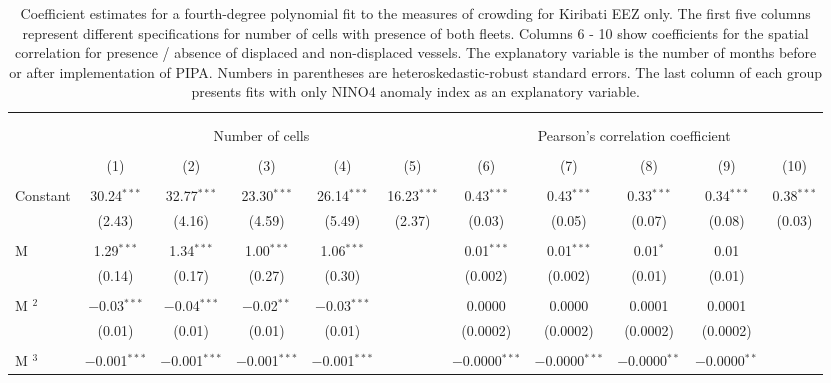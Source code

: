 
\begin{table}[H] \centering 
  \caption{\label{tab:KIR_sp_corr}Coefficient estimates for a fourth-degree polynomial fit to the measures of crowding for Kiribati EEZ only. The first five columns represent different specifications for number of cells with presence of both fleets. Columns 6 - 10 show coefficients for the spatial correlation for presence / absence of displaced and non-displaced vessels. The explanatory variable is the number of months before or after implementation of PIPA. Numbers in parentheses are heteroskedastic-robust standard errors. The last column of each group presents fits with only NINO4 anomaly index as an explanatory variable.} 
  \label{} 
\footnotesize 
\begin{tabular}{@{\extracolsep{0.1pt}}lcccccccccc} 
\\[-1.8ex]\hline 
\hline \\[-1.8ex] 
\\[-1.8ex] & \multicolumn{5}{c}{Number of cells} & \multicolumn{5}{c}{Pearson's correlation coefficient} \\ 
\\[-1.8ex] & (1) & (2) & (3) & (4) & (5) & (6) & (7) & (8) & (9) & (10)\\ 
\hline \\[-1.8ex] 
 Constant & 30.24$^{***}$ & 32.77$^{***}$ & 23.30$^{***}$ & 26.14$^{***}$ & 16.23$^{***}$ & 0.43$^{***}$ & 0.43$^{***}$ & 0.33$^{***}$ & 0.34$^{***}$ & 0.38$^{***}$ \\ 
  & (2.43) & (4.16) & (4.59) & (5.49) & (2.37) & (0.03) & (0.05) & (0.07) & (0.08) & (0.03) \\ 
  & & & & & & & & & & \\ 
 M & 1.29$^{***}$ & 1.34$^{***}$ & 1.00$^{***}$ & 1.06$^{***}$ &  & 0.01$^{***}$ & 0.01$^{***}$ & 0.01$^{*}$ & 0.01 &  \\ 
  & (0.14) & (0.17) & (0.27) & (0.30) &  & (0.002) & (0.002) & (0.01) & (0.01) &  \\ 
  & & & & & & & & & & \\ 
 M $^2$ & $-$0.03$^{***}$ & $-$0.04$^{***}$ & $-$0.02$^{**}$ & $-$0.03$^{***}$ &  & 0.0000 & 0.0000 & 0.0001 & 0.0001 &  \\ 
  & (0.01) & (0.01) & (0.01) & (0.01) &  & (0.0002) & (0.0002) & (0.0002) & (0.0002) &  \\ 
  & & & & & & & & & & \\ 
 M $^3$ & $-$0.001$^{***}$ & $-$0.001$^{***}$ & $-$0.001$^{***}$ & $-$0.001$^{***}$ &  & $-$0.0000$^{***}$ & $-$0.0000$^{***}$ & $-$0.0000$^{**}$ & $-$0.0000$^{**}$ &  \\ 

\end{tabular}
\end{table}
